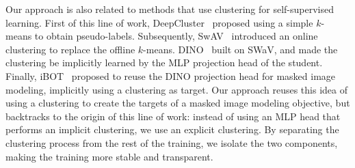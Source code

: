 Our approach is also related to methods that use clustering for self-supervised learning.
First of this line of work, DeepCluster~\citep{deepcluster} proposed using a simple $k$-means to obtain pseudo-labels.
Subsequently, SwAV~\citep{swav} introduced an online clustering to replace the offline $k$-means.
DINO~\citep{dino} built on SWaV, and made the clustering be implicitly learned by the MLP projection head of the student.
Finally, iBOT~\citep{ibot} proposed to reuse the DINO projection head for masked image modeling, implicitly using a clustering as target.
Our approach reuses this idea of using a clustering to create the targets of a masked image modeling objective, but backtracks to the origin of this line of work: instead of using an MLP head that performs an implicit clustering, we use an explicit clustering.
By separating the clustering process from the rest of the training, we isolate the two components, making the training more stable and transparent.
